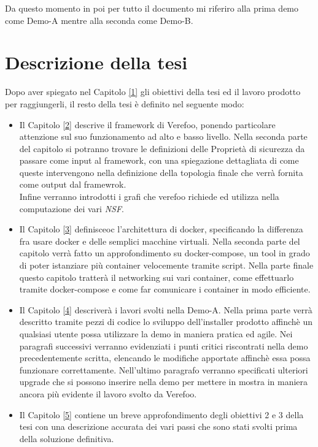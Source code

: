Da questo momento in poi per tutto il documento mi riferiro alla prima demo come Demo-A mentre alla seconda come Demo-B.

\section{Descrizione della tesi}

Dopo aver spiegato nel Capitolo \hyperref[ch:intro]{[1]} gli obiettivi della tesi ed il lavoro prodotto per raggiungerli, il resto della
tesi è definito nel seguente modo:

\begin{itemize}
    \item Il Capitolo \hyperref[ch:intro]{[2]} descrive il framework di Verefoo, ponendo particolare attenzione sul suo funzionamento ad alto e basso livello.
        Nella seconda parte del capitolo si potranno trovare le  definizioni delle Proprietà di sicurezza da passare come input al framework, con una spiegazione dettagliata
        di come queste intervengono nella definizione della topologia finale che verrà fornita come output dal framewrok. \\
        Infine verranno introdotti i grafi che verefoo richiede ed utilizza nella computazione dei vari \textit{NSF}.
    \item Il Capitolo \hyperref[ch:intro]{[3]} definisceoc l'architettura di docker, specificando la differenza fra usare docker e delle semplici macchine virtuali. Nella seconda parte del capitolo
          verrà fatto un approfondimento su docker-compose, un tool in grado di poter istanziare più container velocemente tramite script. Nella parte finale questo capitolo tratterà il networking
          sui vari container, come effettuarlo tramite docker-compose e come far comunicare i container in modo efficiente.
    \item Il Capitolo \hyperref[ch:intro]{[4]} descriverà i lavori svolti nella Demo-A. Nella prima parte verrà descritto tramite pezzi di codice lo sviluppo dell'installer prodotto affinchè un qualsiasi utente possa
          utilizzare la demo in maniera pratica ed agile. Nei paragrafi successivi verranno evidenziati i punti critici riscontrati nella demo precedentemente scritta, elencando le modifiche apportate affinchè essa possa funzionare correttamente.
          Nell'ultimo paragrafo verranno specificati ulteriori upgrade che si possono inserire nella demo per mettere in mostra in maniera ancora più evidente il lavoro svolto da Verefoo.
    \item Il Capitolo \hyperref[ch:intro]{[5]} contiene un breve approfondimento degli obiettivi 2 e 3 della tesi con una descrizione accurata dei vari passi che sono stati svolti prima della soluzione definitiva.

\end{itemize}
